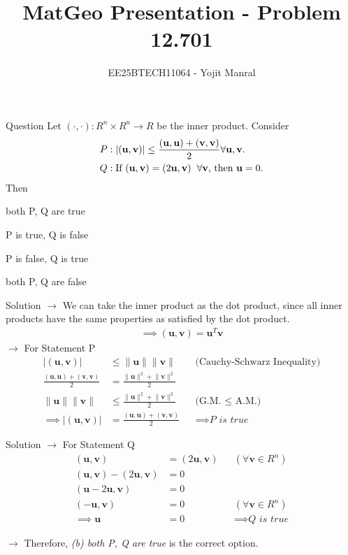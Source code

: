 \documentclass{beamer}
\title{MatGeo Presentation - Problem 12.701}
\author{EE25BTECH11064 - Yojit Manral}
\date{}
\numberwithin{equation}{section}
\theoremstyle{remark}
\providecommand{\norm}[1]{\lVert#1\rVert}
\let\vec\mathbf
\begin{document}
\frame{\titlepage}
\begin{frame}{Question}
Let $ (\cdot, \cdot) : R^n \times R^n \rightarrow R $ be the inner product. Consider
\begin{align*}
    P &: |(\vec{u}, \vec{v})| \leq \frac{(\vec{u}, \vec{u})+(\vec{v}, \vec{v})}{2} \forall \vec{u}, \vec{v}. \\
    Q &: \text{If }(\vec{u}, \vec{v}) = (2\vec{u}, \vec{v}) \hspace{0.2cm} \forall \vec{v} \text{, then }\vec{u} = 0.
\end{align*}
Then
\begin{enumerate}[label=(\alph*)]
\begin{multicols}{2}
    \item both P, Q are true
    \item P is true, Q is false
    \item P is false, Q is true
    \item both P, Q are false
\end{multicols}
\end{enumerate}
\end{frame}

\begin{frame}{Solution}
$\rightarrow$ We can take the inner product as the dot product, since all inner products have the same properties as satisfied by the dot product.
\begin{align}
    \implies (\vec{u}, \vec{v}) = \vec{u}^T\vec{v}
\end{align}
$\rightarrow$ For Statement P
\begin{align}
    |(\vec{u}, \vec{v})| &\leq \norm{\vec{u}}\norm{\vec{v}} && \text{(Cauchy-Schwarz Inequality)} \\
    \frac{(\vec{u}, \vec{u}) + (\vec{v}, \vec{v})}{2} &= \frac{\norm{\vec{u}}^2 + \norm{\vec{v}}^2}{2} \\
    \norm{\vec{u}}\norm{\vec{v}} &\leq \frac{\norm{\vec{u}}^2 + \norm{\vec{v}}^2}{2} && \text{(G.M. $\leq$ A.M.)} \\
    \implies |(\vec{u}, \vec{v})| &= \frac{(\vec{u}, \vec{u})+(\vec{v}, \vec{v})}{2} && \implies \textit{P is true}
\end{align}
\end{frame}

\begin{frame}{Solution}
$\rightarrow$ For Statement Q
\begin{align}
    (\vec{u}, \vec{v}) &= (2\vec{u}, \vec{v}) && (\forall \vec{v} \in R^n) \\
    (\vec{u}, \vec{v}) - (2\vec{u}, \vec{v}) &= 0 \\
    (\vec{u} - 2\vec{u}, \vec{v}) &= 0 \\
    (-\vec{u}, \vec{v}) &= 0 && (\forall \vec{v} \in R^n) \\
    \implies \vec{u} &= 0 && \implies \textit{Q is true}
\end{align}

$\longrightarrow$ Therefore, \textit{(b) both P, Q are true} is the correct option.
\end{frame}
\end{document}
